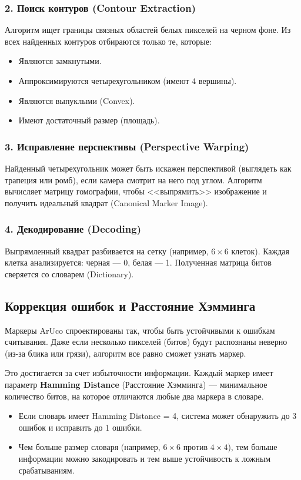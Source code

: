 \subsubsection{2. Поиск контуров (Contour Extraction)}
Алгоритм ищет границы связных областей белых пикселей на черном фоне. Из всех найденных контуров отбираются только те, которые:
\begin{itemize}
    \item Являются замкнутыми.
    \item Аппроксимируются четырехугольником (имеют 4 вершины).
    \item Являются выпуклыми (Convex).
    \item Имеют достаточный размер (площадь).
\end{itemize}

\subsubsection{3. Исправление перспективы (Perspective Warping)}
Найденный четырехугольник может быть искажен перспективой (выглядеть как трапеция или ромб), если камера смотрит на него под углом. Алгоритм вычисляет матрицу гомографии, чтобы <<выпрямить>> изображение и получить идеальный квадрат (Canonical Marker Image).

\subsubsection{4. Декодирование (Decoding)}
Выпрямленный квадрат разбивается на сетку (например, $6 \times 6$ клеток). Каждая клетка анализируется: черная — 0, белая — 1. Полученная матрица битов сверяется со словарем (Dictionary).

\subsection{Коррекция ошибок и Расстояние Хэмминга}
Маркеры ArUco спроектированы так, чтобы быть устойчивыми к ошибкам считывания. Даже если несколько пикселей (битов) будут распознаны неверно (из-за блика или грязи), алгоритм все равно сможет узнать маркер.

Это достигается за счет избыточности информации. Каждый маркер имеет параметр \textbf{Hamming Distance} (Расстояние Хэмминга) — минимальное количество битов, на которое отличаются любые два маркера в словаре.
\begin{itemize}
    \item Если словарь имеет Hamming Distance = 4, система может обнаружить до 3 ошибок и исправить до 1 ошибки.
    \item Чем больше размер словаря (например, $6 \times 6$ против $4 \times 4$), тем больше информации можно закодировать и тем выше устойчивость к ложным срабатываниям.
\end{itemize}

